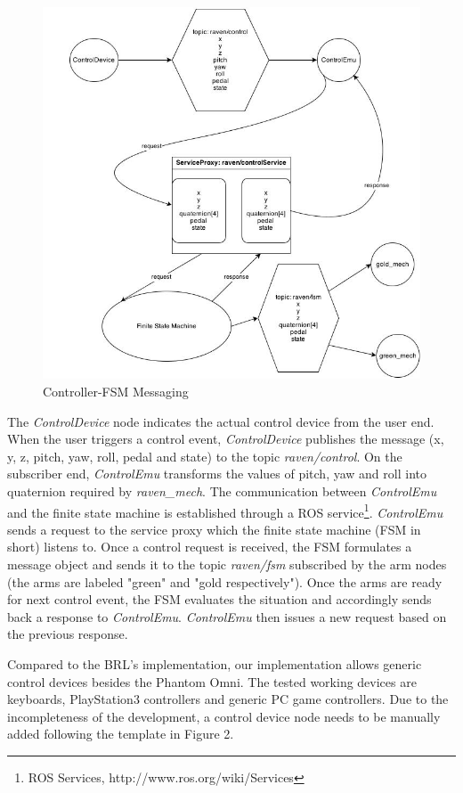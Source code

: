\documentclass[letterpaper,twocolumn,10pt]{article}
\begin{document}
\begin{figure}[h]
\includegraphics[scale=0.33]{ControlDiagram.jpg}
\caption{Controller-FSM Messaging}
\end{figure}

The {\it ControlDevice} node indicates the actual control device from
the user end. When the user triggers a control event, {\it
  ControlDevice} publishes the message (x, y, z, pitch, yaw, roll,
pedal and state) to the topic {\it raven/control}. On the subscriber
end, {\it ControlEmu} transforms the values of pitch, yaw and roll
into quaternion required by {\it raven\_mech}. The communication
between {\it ControlEmu} and the finite state machine is established
through a ROS service\footnote{ROS Services,
  http://www.ros.org/wiki/Services}. {\it ControlEmu} sends a request
to the service proxy which the finite state machine (FSM in short)
listens to. Once a control request is received, the FSM formulates a
message object and sends it to the topic {\it raven/fsm} subscribed by
the arm nodes (the arms are labeled "green" and "gold
respectively"). Once the arms are ready for next control event, the
FSM evaluates the situation and accordingly sends back a response to
{\it ControlEmu}. {\it ControlEmu} then issues a new request based on
the previous response.

Compared to the BRL's implementation, our implementation allows
generic control devices besides the Phantom Omni. The tested working
devices are keyboards, PlayStation3 controllers and generic PC game
controllers. Due to the incompleteness of the development, a control
device node needs to be manually added following the template in
Figure 2.
\end{document}

